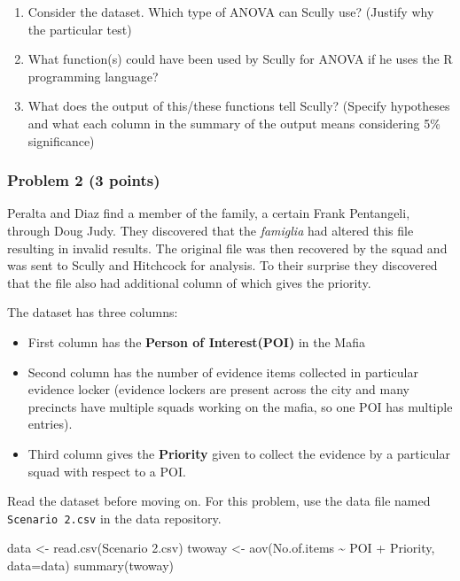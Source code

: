 \documentclass[
]{article}
\newenvironment{Shaded}{\begin{snugshade}}{\end{snugshade}}
\newcommand{\AttributeTok}[1]{\textcolor[rgb]{0.77,0.63,0.00}{#1}}
\newcommand{\FunctionTok}[1]{\textcolor[rgb]{0.00,0.00,0.00}{#1}}
\newcommand{\NormalTok}[1]{#1}
\newcommand{\OtherTok}[1]{\textcolor[rgb]{0.56,0.35,0.01}{#1}}
\newcommand{\SpecialCharTok}[1]{\textcolor[rgb]{0.00,0.00,0.00}{#1}}
\newcommand{\StringTok}[1]{\textcolor[rgb]{0.31,0.60,0.02}{#1}}
\providecommand{\tightlist}{%
  \setlength{\itemsep}{0pt}\setlength{\parskip}{0pt}}
\begin{document}
\begin{enumerate}
\def\labelenumi{\arabic{enumi}.}
\tightlist
\item
  Consider the dataset. Which type of ANOVA can Scully use? (Justify why
  the particular test)
\item
  What function(s) could have been used by Scully for ANOVA if he uses
  the R programming language?
\item
  What does the output of this/these functions tell Scully? (Specify
  hypotheses and what each column in the summary of the output means
  considering 5\% significance)
\end{enumerate}

\hypertarget{problem-2-3-points}{%
\subsubsection{Problem 2 (3 points)}\label{problem-2-3-points}}

Peralta and Diaz find a member of the family, a certain Frank
Pentangeli, through Doug Judy. They discovered that the \emph{famiglia}
had altered this file resulting in invalid results. The original file
was then recovered by the squad and was sent to Scully and Hitchcock for
analysis. To their surprise they discovered that the file also had
additional column of which gives the priority.

The dataset has three columns:

\begin{itemize}
\tightlist
\item
  First column has the \textbf{Person of Interest(POI)} in the Mafia
\item
  Second column has the number of evidence items collected in particular
  evidence locker (evidence lockers are present across the city and many
  precincts have multiple squads working on the mafia, so one POI has
  multiple entries).
\item
  Third column gives the \textbf{Priority} given to collect the evidence
  by a particular squad with respect to a POI.
\end{itemize}

Read the dataset before moving on. For this problem, use the data file
named \texttt{Scenario\ 2.csv} in the data repository.

\begin{Shaded}
\begin{Highlighting}[]
\NormalTok{data }\OtherTok{\textless{}{-}} \FunctionTok{read.csv}\NormalTok{(}\StringTok{\textquotesingle{}Scenario 2.csv\textquotesingle{}}\NormalTok{)}
\NormalTok{twoway }\OtherTok{\textless{}{-}} \FunctionTok{aov}\NormalTok{(No.of.items }\SpecialCharTok{\textasciitilde{}}\NormalTok{ POI }\SpecialCharTok{+}\NormalTok{ Priority, }\AttributeTok{data=}\NormalTok{data)}
\FunctionTok{summary}\NormalTok{(twoway)}
\end{Highlighting}
\end{Shaded}
\end{document}
